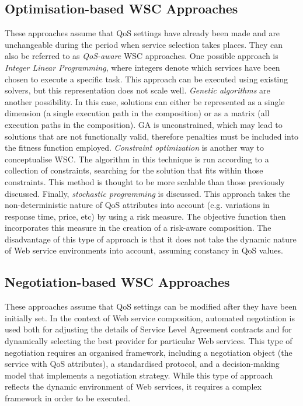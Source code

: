 \documentclass[a4paper,10pt]{article}
\begin{document}
\subsection{Optimisation-based WSC Approaches}
These approaches assume that QoS settings have already been made and are unchangeable during the period when service selection
takes places. They can also be referred to as \textit{QoS-aware} WSC approaches. One possible approach is \textit{Integer Linear
Programming}, where integers denote which services have been chosen to execute a specific task. This approach can be executed using
existing solvers, but this representation does not scale well. \textit{Genetic algorithms} are another possibility. In this case,
solutions can either be represented as a single dimension (a single execution path in the composition) or as a matrix (all execution
paths in the composition). GA is unconstrained, which may lead to solutions that are not functionally valid, therefore penalties
must be included into the fitness function employed. \textit{Constraint optimization} is another way to conceptualise WSC.
The algorithm in this technique is run according to a collection of constraints, searching for the solution that fits within
those constraints. This method is thought to be more scalable than those previously discussed. Finally, \textit{stochastic
programming} is discussed. This approach takes the non-deterministic nature of QoS attributes into account (e.g. variations in
response time, price, etc) by using a risk measure. The objective function then incorporates this measure in the creation of
a risk-aware composition. The disadvantage of this type of approach is that it does not take the dynamic nature of Web service
environments into account, assuming constancy in QoS values.

\subsection{Negotiation-based WSC Approaches}
These approaches assume that QoS settings can be modified after they have been initially set. In the context of Web service composition,
automated negotiation is used both for adjusting the details of Service Level Agreement contracts and for dynamically selecting the best
provider for particular Web services. This type of negotiation requires an organised framework, including a negotiation object (the service
with QoS attributes), a standardised protocol, and a decision-making model that implements a negotiation strategy. While this type of
approach reflects the dynamic environment of Web services, it requires a complex framework in order to be executed.
\end{document}
